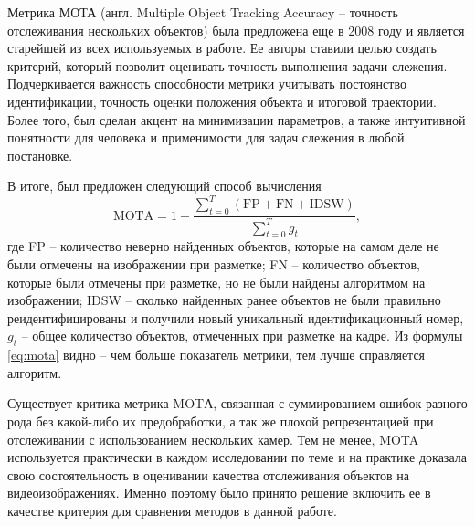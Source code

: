 Метрика МОТА\cite{bernardin2008evaluating} (англ. Multiple Object Tracking Accuracy -- точность отслеживания нескольких объектов) была предложена еще в 2008 году и является старейшей из всех используемых в работе. 
Ее авторы ставили целью создать критерий, который позволит оценивать точность выполнения задачи слежения. 
Подчеркивается важность способности метрики учитывать постоянство идентификации, точность оценки положения объекта и итоговой траектории.
Более того, был сделан акцент на минимизации параметров, а также интуитивной понятности для человека и применимости для задач слежения в любой постановке.

В итоге, был предложен следующий способ вычисления 
\begin{equation}
    \text{MOTA} = 1 - \frac{\sum_{t=0}^{T}(\text{FP} + \text{FN} + \text{IDSW})}{\sum_{t=0}^{T}g_t},
    \label{eq:mota}
\end{equation}
где FP -- количество неверно найденных объектов, которые на самом деле не были отмечены на изображении при разметке; FN -- количество объектов, которые были отмечены при разметке, но не были найдены алгоритмом на изображении; 
IDSW -- сколько найденных ранее объектов не были правильно реидентифицированы и получили новый уникальный идентификационный номер, \(g_t\) -- общее количество объектов, отмеченных при разметке на кадре.
Из формулы \ref{eq:mota} видно -- чем больше показатель метрики, тем лучше справляется алгоритм.

Существует критика метрика MOTА, связанная с суммированием ошибок разного рода без какой-либо их предобработки, %
а так же плохой репрезентацией при отслеживании с использованием нескольких камер. %
Тем не менее, MOTA используется практически в каждом исследовании по теме и на практике доказала свою состоятельность в оценивании качества отслеживания объектов на видеоизображениях. Именно поэтому было принято решение включить ее в качестве критерия для сравнения методов в данной работе.